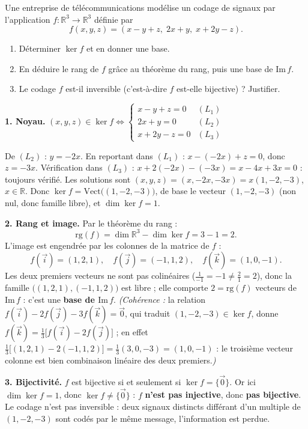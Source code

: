 \documentclass[11pt]{article}
\begin{document}
\begin{exoresolu}
Une entreprise de télécommunications modélise un codage de signaux par l'application $f:\mathbb{R}^3\to\mathbb{R}^3$ définie par
\[
f(x,y,z)=(x-y+z,\;2x+y,\;x+2y-z).
\]
\begin{enumerate}
\item Déterminer $\ker f$ et en donner une base.
\item En déduire le rang de $f$ grâce au théorème du rang, puis une base de $\mathrm{Im}\,f$.
\item Le codage $f$ est-il inversible (c'est-à-dire $f$ est-elle bijective) ? Justifier.
\end{enumerate}
\tcblower
\textbf{1. Noyau.} $(x,y,z)\in\ker f\Leftrightarrow \begin{cases} x-y+z=0 & (L_1)\\ 2x+y=0 & (L_2)\\ x+2y-z=0 & (L_3)\end{cases}$

De $(L_2)$ : $y=-2x$. En reportant dans $(L_1)$ : $x-(-2x)+z=0$, donc $z=-3x$.
Vérification dans $(L_3)$ : $x+2(-2x)-(-3x)=x-4x+3x=0$ : toujours vérifié.
Les solutions sont $(x,y,z)=(x,-2x,-3x)=x(1,-2,-3)$, $x\in\mathbb{R}$.
Donc $\ker f=\mathrm{Vect}\big((1,-2,-3)\big)$, de base le vecteur $(1,-2,-3)$ (non nul, donc famille libre), et $\dim\ker f=1$.

\textbf{2. Rang et image.} Par le théorème du rang :
\[
\mathrm{rg}(f)=\dim\mathbb{R}^3-\dim\ker f=3-1=2.
\]
L'image est engendrée par les colonnes de la matrice de $f$ :
\[
f(\vec{i})=(1,2,1),\quad f(\vec{j})=(-1,1,2),\quad f(\vec{k})=(1,0,-1).
\]
Les deux premiers vecteurs ne sont pas colinéaires ($\frac{1}{-1}=-1\neq\frac{2}{1}=2$), donc la famille $\big((1,2,1),(-1,1,2)\big)$ est libre ; elle comporte $2=\mathrm{rg}(f)$ vecteurs de $\mathrm{Im}\,f$ : c'est une \textbf{base de $\mathrm{Im}\,f$}.
\emph{(Cohérence :} la relation $f(\vec{i})-2f(\vec{j})-3f(\vec{k})=\vec{0}$, qui traduit $(1,-2,-3)\in\ker f$, donne $f(\vec{k})=\tfrac13\big[f(\vec{i})-2f(\vec{j})\big]$ ; en effet $\tfrac13\big[(1,2,1)-2(-1,1,2)\big]=\tfrac13(3,0,-3)=(1,0,-1)$ : le troisième vecteur colonne est bien combinaison linéaire des deux premiers.\emph{)}

\textbf{3. Bijectivité.} $f$ est bijective si et seulement si $\ker f=\{\vec{0}\}$. Or ici $\dim\ker f=1$, donc $\ker f\neq\{\vec{0}\}$ : $f$ \textbf{n'est pas injective}, donc \textbf{pas bijective}. Le codage n'est pas inversible : deux signaux distincts différant d'un multiple de $(1,-2,-3)$ sont codés par le même message, l'information est perdue.
\end{exoresolu}
\end{document}
